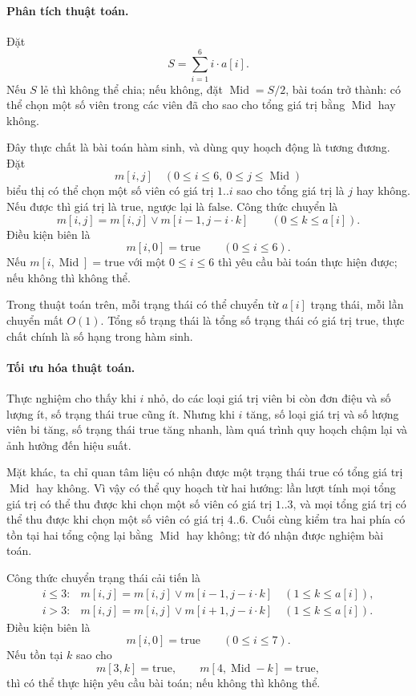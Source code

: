 \documentclass[11pt]{article}
\begin{document}
\paragraph{Phân tích thuật toán.}
Đặt
\[
  S=\sum_{i=1}^{6} i\cdot a[i].
\]
Nếu \(S\) lẻ thì không thể chia; nếu không, đặt \(\operatorname{Mid}=S/2\),
bài toán trở thành: có thể chọn một số viên trong các viên đã cho sao cho
tổng giá trị bằng \(\operatorname{Mid}\) hay không.

Đây thực chất là bài toán hàm sinh, và dùng quy hoạch động là tương đương.
Đặt
\[
  m[i,j]\quad (0\le i\le6,\ 0\le j\le \operatorname{Mid})
\]
biểu thị có thể chọn một số viên có giá trị \(1..i\) sao cho tổng giá trị là
\(j\) hay không. Nếu được thì giá trị là \(\mathrm{true}\), ngược lại là
\(\mathrm{false}\). Công thức chuyển là
\[
  m[i,j]=m[i,j]\vee m[i-1,j-i\cdot k]\qquad (0\le k\le a[i]).
\]
Điều kiện biên là
\[
  m[i,0]=\mathrm{true}\qquad (0\le i\le6).
\]
Nếu \(m[i,\operatorname{Mid}]=\mathrm{true}\) với một \(0\le i\le6\) thì yêu
cầu bài toán thực hiện được; nếu không thì không thể.

Trong thuật toán trên, mỗi trạng thái có thể chuyển từ \(a[i]\) trạng thái,
mỗi lần chuyển mất \(O(1)\). Tổng số trạng thái là tổng số trạng thái có giá
trị \(\mathrm{true}\), thực chất chính là số hạng trong hàm sinh.

\paragraph{Tối ưu hóa thuật toán.}
Thực nghiệm cho thấy khi \(i\) nhỏ, do các loại giá trị viên bi còn đơn điệu
và số lượng ít, số trạng thái \(\mathrm{true}\) cũng ít. Nhưng khi \(i\) tăng,
số loại giá trị và số lượng viên bi tăng, số trạng thái \(\mathrm{true}\)
tăng nhanh, làm quá trình quy hoạch chậm lại và ảnh hưởng đến hiệu suất.

Mặt khác, ta chỉ quan tâm liệu có nhận được một trạng thái
\(\mathrm{true}\) có tổng giá trị \(\operatorname{Mid}\) hay không. Vì vậy có
thể quy hoạch từ hai hướng: lần lượt tính mọi tổng giá trị có thể thu được
khi chọn một số viên có giá trị \(1..3\), và mọi tổng giá trị có thể thu được
khi chọn một số viên có giá trị \(4..6\). Cuối cùng kiểm tra hai phía có tồn
tại hai tổng cộng lại bằng \(\operatorname{Mid}\) hay không; từ đó nhận được
nghiệm bài toán.

Công thức chuyển trạng thái cải tiến là
\[
\begin{array}{ll}
i\le3: & m[i,j]=m[i,j]\vee m[i-1,j-i\cdot k]\quad (1\le k\le a[i]),\\
i>3: & m[i,j]=m[i,j]\vee m[i+1,j-i\cdot k]\quad (1\le k\le a[i]).
\end{array}
\]
Điều kiện biên là
\[
  m[i,0]=\mathrm{true}\qquad (0\le i\le7).
\]
Nếu tồn tại \(k\) sao cho
\[
  m[3,k]=\mathrm{true},\qquad
  m[4,\operatorname{Mid}-k]=\mathrm{true},
\]
thì có thể thực hiện yêu cầu bài toán; nếu không thì không thể.
\end{document}

